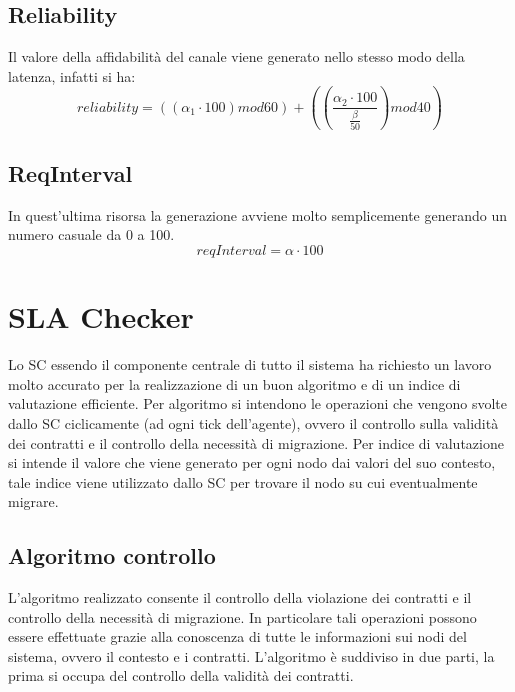 \subsection{Reliability}
Il valore della affidabilità del canale viene generato nello stesso modo della latenza, infatti si ha:
\begin{equation}
reliability = ((\alpha_{1} \cdot 100)mod60) + \left( \left(\frac{\alpha_{2} \cdot 100}{\frac{\beta}{50}}\right)mod40\right)
\end{equation}
\subsection{ReqInterval}
In quest'ultima risorsa la generazione avviene molto semplicemente generando un numero casuale da 0 a 100.
\begin{equation}
reqInterval = \alpha \cdot 100
\end{equation}
\section{SLA Checker}
Lo SC essendo il componente centrale di tutto il sistema ha richiesto un lavoro molto accurato per la realizzazione di un buon algoritmo e di un indice di valutazione efficiente. Per algoritmo si intendono le operazioni che vengono svolte dallo SC ciclicamente (ad ogni tick dell'agente), ovvero il controllo sulla validità dei contratti e il controllo della necessità di migrazione. Per indice di valutazione si intende il valore che viene generato per ogni nodo dai valori del suo contesto, tale indice viene utilizzato dallo SC per trovare il nodo su cui eventualmente migrare.
\subsection{Algoritmo controllo}
L'algoritmo realizzato consente il controllo della violazione dei contratti e il controllo della necessità di migrazione. In particolare tali operazioni possono essere effettuate grazie alla conoscenza di tutte le informazioni sui nodi del sistema, ovvero il contesto e i contratti. L'algoritmo è suddiviso in due parti, la prima si occupa del controllo della validità dei contratti.
